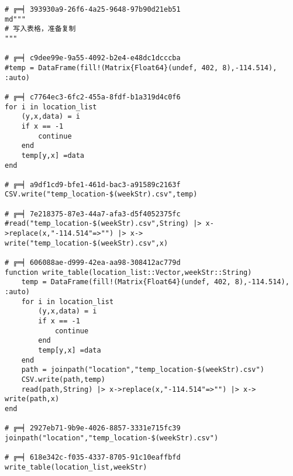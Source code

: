 \begin{appendices}
\begin{lstlisting}
# ╔═╡ 393930a9-26f6-4a25-9648-97b90d21eb51
md"""
# 写入表格，准备复制
"""

# ╔═╡ c9dee99e-9a55-4092-b2e4-e48dc1dcccba
#temp = DataFrame(fill!(Matrix{Float64}(undef, 402, 8),-114.514), :auto)

# ╔═╡ c7764ec3-6fc2-455a-8fdf-b1a319d4c0f6
for i in location_list
	(y,x,data) = i
	if x == -1
		continue
	end
	temp[y,x] =data
end

# ╔═╡ a9df1cd9-bfe1-461d-bac3-a91589c2163f
CSV.write("temp_location-$(weekStr).csv",temp)

# ╔═╡ 7e218375-87e3-44a7-afa3-d5f4052375fc
#read("temp_location-$(weekStr).csv",String) |> x->replace(x,"-114.514"=>"") |> x-> write("temp_location-$(weekStr).csv",x)

# ╔═╡ 606088ae-d999-42ea-aa98-308412ac779d
function write_table(location_list::Vector,weekStr::String)
	temp = DataFrame(fill!(Matrix{Float64}(undef, 402, 8),-114.514), :auto)
	for i in location_list
		(y,x,data) = i
		if x == -1
			continue
		end
		temp[y,x] =data
	end
	path = joinpath("location","temp_location-$(weekStr).csv")
	CSV.write(path,temp)
	read(path,String) |> x->replace(x,"-114.514"=>"") |> x-> write(path,x)
end

# ╔═╡ 2927eb71-9b9e-4026-8857-3331e715fc39
joinpath("location","temp_location-$(weekStr).csv")

# ╔═╡ 618e342c-f035-4337-8705-91c10eaffbfd
write_table(location_list,weekStr)


\end{lstlisting}
\end{appendices}